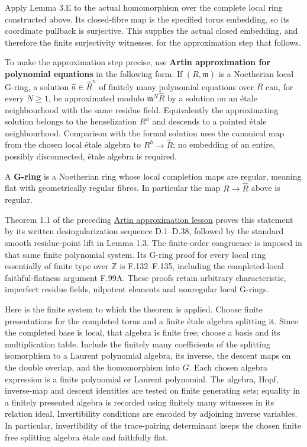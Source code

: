 \documentclass[11pt,a4paper,openany]{report}
\begin{document}
Apply Lemma 3.E to the actual homomorphism over the complete local ring constructed above. Its closed-fibre map is the specified torus embedding, so its coordinate pullback is surjective. This supplies the actual closed embedding, and therefore the finite surjectivity witnesses, for the approximation step that follows.

To make the approximation step precise, use \textbf{Artin approximation for polynomial equations} in the following form. If \((R,\mathfrak m)\) is a Noetherian local G-ring, a solution \(\widehat a\in\widehat R^n\) of finitely many polynomial equations over \(R\) can, for every \(N\geq1\), be approximated modulo \(\mathfrak m^N\widehat R\) by a solution on an étale neighbourhood with the same residue field. Equivalently the approximating solution belongs to the henselization \(R^h\) and descends to a pointed étale neighbourhood. Comparison with the formal solution uses the canonical map from the chosen local étale algebra to \(R^h\to\widehat R\); no embedding of an entire, possibly disconnected, étale algebra is required.

A \textbf{G-ring} is a Noetherian ring whose local completion maps are regular, meaning flat with geometrically regular fibres. In particular the map \(R\to\widehat R\) above is regular.

Theorem 1.1 of the preceding \href{https://github.com/KokunoYumeto/open-math-courses/blob/main/docs/courses/AG-RG/AG-RG-S05.md}{Artin approximation lesson} proves this statement by its written desingularization sequence D.1--D.38, followed by the standard smooth residue-point lift in Lemma 1.3. The finite-order congruence is imposed in that same finite polynomial system. Its G-ring proof for every local ring essentially of finite type over \(\mathbb Z\) is F.132--F.135, including the completed-local faithful-flatness argument F.99A. These proofs retain arbitrary characteristic, imperfect residue fields, nilpotent elements and nonregular local G-rings.

Here is the finite system to which the theorem is applied. Choose finite presentations for the completed torus and a finite étale algebra splitting it. Since the completed base is local, that algebra is finite free; choose a basis and its multiplication table. Include the finitely many coefficients of the splitting isomorphism to a Laurent polynomial algebra, its inverse, the descent maps on the double overlap, and the homomorphism into \(G\). Each chosen algebra expression is a finite polynomial or Laurent polynomial. The algebra, Hopf, inverse-map and descent identities are tested on finite generating sets; equality in a finitely presented algebra is recorded using finitely many witnesses in its relation ideal. Invertibility conditions are encoded by adjoining inverse variables. In particular, invertibility of the trace-pairing determinant keeps the chosen finite free splitting algebra étale and faithfully flat.
\end{document}

